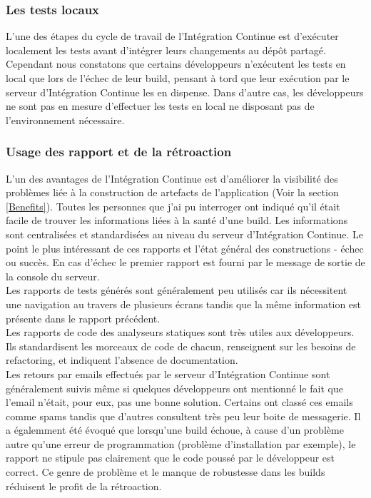       \subsubsection{Les tests locaux}
      L'une des étapes du cycle de travail de l'Intégration Continue est d'exécuter localement les tests avant d'intégrer leurs changements au dépôt partagé. Cependant nous constatons que certains développeurs n'exécutent les tests en local que lors de l'échec de leur build, pensant à tord que leur exécution par le serveur d'Intégration Continue les en dispense. Dans d'autre cas, les développeurs ne sont pas en mesure d'effectuer les tests en local ne disposant pas de l'environnement nécessaire.

      \subsubsection{Usage des rapport et de la rétroaction}
      L'un des avantages de l'Intégration Continue est d'améliorer la visibilité des problèmes liée à la construction de artefacts de l'application (Voir la section \ref{Benefits}). Toutes les personnes que j'ai pu interroger ont indiqué qu'il était facile de trouver les informations liées à la santé d'une build. Les informations sont centralisées et standardisées au niveau du serveur d'Intégration Continue. Le point le plus intéressant de ces rapports et l'état général des constructions - échec ou succès. En cas d'échec le premier rapport est fourni par le message de sortie de la console du serveur.\\

      Les rapports de tests générés sont généralement peu utilisés car ils nécessitent une navigation au travers de plusieurs écrans tandis que la même information est présente dans le rapport précédent.\\

      Les rapports de code des analyseurs statiques sont très utiles aux développeurs. Ils standardisent les morceaux de code de chacun, renseignent sur les besoins de refactoring, et indiquent l'absence de documentation.\\

      Les retours par emails effectués par le serveur d'Intégration Continue sont généralement suivis même si quelques développeurs ont mentionné le fait que l'email n'était, pour eux, pas une bonne solution. Certains ont classé ces emails comme spams tandis que d'autres consultent très peu leur boite de messagerie. Il a égalemment été évoqué que lorsqu'une build échoue, à cause d'un problème autre qu'une erreur de programmation (problème d'installation par exemple), le rapport ne stipule pas clairement que le code poussé par le développeur est correct. Ce genre de problème et le manque de robustesse dans les builds réduisent le profit de la rétroaction.\\

